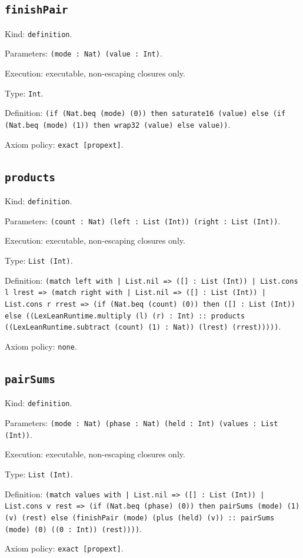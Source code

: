 \documentclass[11pt]{article}
\begin{document}
\subsection*{\texttt{finishPair}}
\noindent Kind: \texttt{definition}.\par
\noindent Parameters: \texttt{(mode : Nat) (value : Int)}.\par
\noindent Execution: executable, non-escaping closures only.\par
\noindent Type: \texttt{Int}.\par
\noindent Definition: \texttt{(if (Nat.beq (mode) (0)) then saturate16 (value) else (if (Nat.beq (mode) (1)) then wrap32 (value) else value))}.\par
\noindent Axiom policy: \texttt{exact [propext]}.\par
\subsection*{\texttt{products}}
\noindent Kind: \texttt{definition}.\par
\noindent Parameters: \texttt{(count : Nat) (left : List (Int)) (right : List (Int))}.\par
\noindent Execution: executable, non-escaping closures only.\par
\noindent Type: \texttt{List (Int)}.\par
\noindent Definition: \texttt{(match left with | List.nil => ([] : List (Int)) | List.cons l lrest => (match right with | List.nil => ([] : List (Int)) | List.cons r rrest => (if (Nat.beq (count) (0)) then ([] : List (Int)) else ((LexLeanRuntime.multiply (l) (r) : Int) :: products ((LexLeanRuntime.subtract (count) (1) : Nat)) (lrest) (rrest)))))}.\par
\noindent Axiom policy: \texttt{none}.\par
\subsection*{\texttt{pairSums}}
\noindent Kind: \texttt{definition}.\par
\noindent Parameters: \texttt{(mode : Nat) (phase : Nat) (held : Int) (values : List (Int))}.\par
\noindent Execution: executable, non-escaping closures only.\par
\noindent Type: \texttt{List (Int)}.\par
\noindent Definition: \texttt{(match values with | List.nil => ([] : List (Int)) | List.cons v rest => (if (Nat.beq (phase) (0)) then pairSums (mode) (1) (v) (rest) else (finishPair (mode) (plus (held) (v)) :: pairSums (mode) (0) ((0 : Int)) (rest))))}.\par
\noindent Axiom policy: \texttt{exact [propext]}.\par
\end{document}
